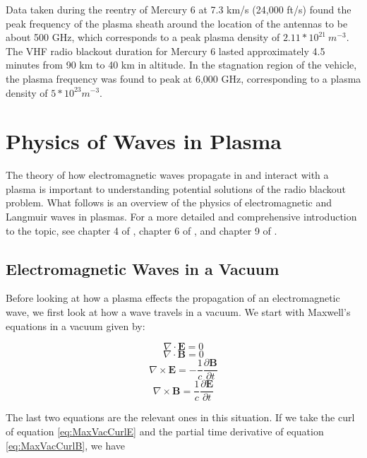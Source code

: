 \documentclass[twocolumn]{article}
\begin{document}
Data taken during the reentry of Mercury 6 at 7.3 km/s (24,000 ft/s) found the peak frequency of the plasma sheath around the location of the antennas to be about 500 GHz, which corresponds to a peak plasma density of $2.11*10^{21} \  m^{-3}$.
The VHF radio blackout duration for Mercury 6 lasted approximately 4.5 minutes from 90 km to 40 km in altitude.
In the stagnation region of the vehicle, the plasma frequency was found to peak at 6,000 GHz, corresponding to a plasma density of $5*10^{23} m^{-3}$. \cite{lehnert_plasma_1964}


\section{Physics of Waves in Plasma} \label{sec:Waves}
The theory of how electromagnetic waves propagate in and interact with a plasma is important to understanding potential solutions of the radio blackout problem.
What follows is an overview of the physics of electromagnetic and Langmuir waves in plasmas.
For a more detailed and comprehensive introduction to the topic, see chapter 4 of \cite{chen_introduction_1984}, chapter 6 of \cite{papas_theory_1965}, and chapter 9 of \cite{fitzpatrick_maxwells_2008}.

\subsection{Electromagnetic Waves in a Vacuum}
Before looking at how a plasma effects the propagation of an electromagnetic wave, we first look at how a wave travels in a vacuum.
We start with Maxwell's equations in a vacuum given by:

\begin{equation}
	\nabla \cdot \mathbf{E} = 0
\end{equation}
\begin{equation}
	\nabla \cdot \mathbf{B} = 0
\end{equation}
\begin{equation} 
	\label{eq:MaxVacCurlE}
	\nabla \times \mathbf{E} = -\frac{1}{c} \frac{\partial \mathbf{B}}{\partial t}
\end{equation}
\begin{equation} 
	\label{eq:MaxVacCurlB}
	\nabla \times \mathbf{B} = \frac{1}{c} \frac{\partial \mathbf{E}}{\partial t}
\end{equation}

The last two equations are the relevant ones in this situation.
If we take the curl of equation \ref{eq:MaxVacCurlE} and the partial time derivative of equation \ref{eq:MaxVacCurlB}, we have
\end{document}
